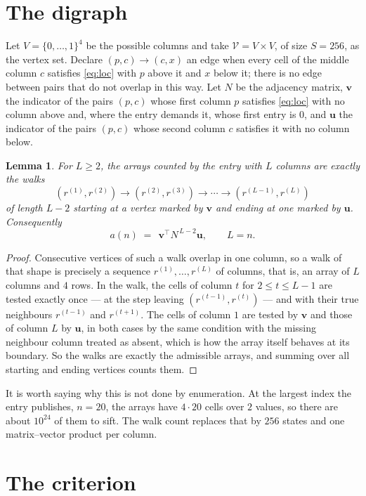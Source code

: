 \documentclass[11pt,a4paper]{article}
\theoremstyle{plain}
\newtheorem{lemma}[theorem]{Lemma}
\theoremstyle{definition}
\begin{document}
\section{The digraph}

Let $V=\{0,\dots,1\}^{4}$ be the possible columns and take
$\mathcal V=V\times V$, of size $S=256$, as the vertex set. Declare $(p,c)\to(c,x)$ an edge
when every cell of the middle column $c$ satisfies \eqref{eq:loc} with $p$ above it and $x$
below it; there is no edge between pairs that do not overlap in this way. Let $N$ be the
adjacency matrix, $\mathbf{v}$ the indicator of the pairs $(p,c)$ whose first column $p$
satisfies \eqref{eq:loc} with no column above and, where the entry demands it, whose first entry is $0$, and $\mathbf{u}$ the indicator of
the pairs $(p,c)$ whose second column $c$ satisfies it with no column below.

\begin{lemma}\label{lem:walk}
For $L\ge2$, the arrays counted by the entry with $L$ columns are exactly the walks
\[
(r^{(1)},r^{(2)})\to(r^{(2)},r^{(3)})\to\cdots\to(r^{(L-1)},r^{(L)})
\]
of length $L-2$ starting at a vertex marked by $\mathbf{v}$ and ending at one marked by
$\mathbf{u}$. Consequently
\[
a(n)\;=\;\,\mathbf{v}^{\!\top}N^{\,L-2}\mathbf{u},\qquad L=n .
\]
\end{lemma}

\begin{proof}
Consecutive vertices of such a walk overlap in one column, so a walk of that shape is
precisely a sequence $r^{(1)},\dots,r^{(L)}$ of columns, that is, an array of $L$ columns
and $4$ rows. In the walk, the cells of column $t$ for $2\le t\le L-1$ are tested
exactly once --- at the step leaving $(r^{(t-1)},r^{(t)})$ --- and with their true
neighbours $r^{(t-1)}$ and $r^{(t+1)}$. The cells of column $1$ are tested by
$\mathbf{v}$ and those of column $L$ by $\mathbf{u}$, in both cases by the same condition
with the missing neighbour column treated as absent, which is how the array itself behaves at
its boundary. So the walks are exactly the admissible arrays, and summing over all starting
and ending vertices counts them.
\end{proof}


It is worth saying why this is not done by enumeration. At the largest index the entry
publishes, $n=20$, the arrays have $4\cdot20$ cells over
$2$ values, so there are about $10^{24}$ of them to sift. The
walk count replaces that by $256$ states and one matrix--vector product per column.
\section{The criterion}
\end{document}
